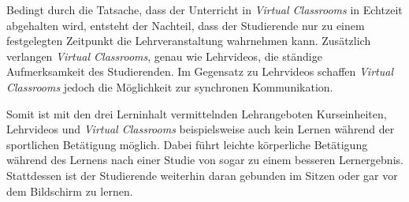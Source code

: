 
Bedingt durch die Tatsache, dass der Unterricht in \textit{Virtual Classrooms} in Echtzeit abgehalten wird, entsteht der Nachteil, dass der Studierende nur zu einem festgelegten Zeitpunkt die Lehrveranstaltung wahrnehmen kann. Zusätzlich verlangen \textit{Virtual Classrooms}, genau wie Lehrvideos, die ständige Aufmerksamkeit des Studierenden. Im Gegensatz zu Lehrvideos schaffen \textit{Virtual Classrooms} jedoch die Möglichkeit zur synchronen Kommunikation.




Somit ist mit den drei Lerninhalt vermittelnden Lehrangeboten Kurseinheiten, Lehrvideos und \textit{Virtual Classrooms} beispielsweise auch kein Lernen während der sportlichen Betätigung möglich. Dabei führt leichte körperliche Betätigung während des Lernens nach einer Studie von \cite{schmidt2013physical} sogar zu einem besseren Lernergebnis. Stattdessen ist der Studierende weiterhin daran gebunden im Sitzen oder gar vor dem Bildschirm zu lernen.

